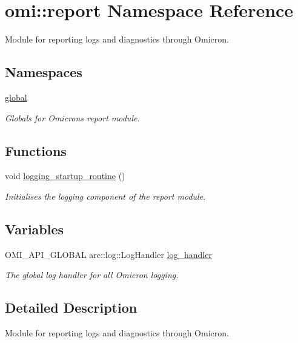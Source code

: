 \hypertarget{namespaceomi_1_1report}{}\section{omi\+:\+:report Namespace Reference}
\label{namespaceomi_1_1report}


Module for reporting logs and diagnostics through Omicron.  


\subsection*{Namespaces}
\begin{DoxyCompactItemize}
\item 
 \hyperlink{namespaceomi_1_1report_1_1global}{global}
\begin{DoxyCompactList}\small\item\em Globals for Omicron\textquotesingle{}s report module. \end{DoxyCompactList}\end{DoxyCompactItemize}
\subsection*{Functions}
\begin{DoxyCompactItemize}
\item 
void \hyperlink{namespaceomi_1_1report_a81005ec8dedc387f73bf5f6cca89891b}{logging\+\_\+startup\+\_\+routine} ()\hypertarget{namespaceomi_1_1report_a81005ec8dedc387f73bf5f6cca89891b}{}\label{namespaceomi_1_1report_a81005ec8dedc387f73bf5f6cca89891b}

\begin{DoxyCompactList}\small\item\em Initialises the logging component of the report module. \end{DoxyCompactList}\end{DoxyCompactItemize}
\subsection*{Variables}
\begin{DoxyCompactItemize}
\item 
O\+M\+I\+\_\+\+A\+P\+I\+\_\+\+G\+L\+O\+B\+AL arc\+::log\+::\+Log\+Handler \hyperlink{namespaceomi_1_1report_a4f7843447250d0b260bdb3f964faa027}{log\+\_\+handler}\hypertarget{namespaceomi_1_1report_a4f7843447250d0b260bdb3f964faa027}{}\label{namespaceomi_1_1report_a4f7843447250d0b260bdb3f964faa027}

\begin{DoxyCompactList}\small\item\em The global log handler for all Omicron logging. \end{DoxyCompactList}\end{DoxyCompactItemize}


\subsection{Detailed Description}
Module for reporting logs and diagnostics through Omicron. 
